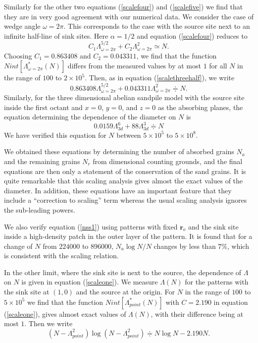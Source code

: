 \documentclass[11pt,a4paper]{book}
\begin{document}
Similarly for the other two equations (\ref{scalefour}) and (\ref{scalefive})
we find that they are in very good agreement with our numerical data.
We consider the case of wedge angle $\omega=2\pi$. 
This corresponds to the case with the source site next to an infinite half-line of sink sites.
Here $\alpha=1/2$ and equation (\ref{scalefour}) reduces to
\begin{equation}
C_{1}\Lambda_{\omega=2\pi}^{5/2}+C_{2}\Lambda_{\omega=2\pi}^{2}\simeq N.
\end{equation}
Choosing $C_{1}=0.863408$ and $C_{2}=0.043311$, we find that the function
$Nint\left[ \Lambda^{\ast}_{\omega=2\pi}\left( N \right) \right]$
differs from the measured values by at most $1$ for all $N$ in the range of $100$ to $2\times10^{5}$.
Then, as in equation (\ref{scalethreehalf}), we write
\begin{equation}
0.863408\Lambda_{\omega=2\pi}^{5/2}+0.043311\Lambda_{\omega=2\pi}^{2}\doteqdot N.
\label{scalefourhalf}
\end{equation}
Similarly, for the three dimensional abelian sandpile model with the source site inside the first octant
and $x=0$, $y=0$, and $z=0$ as the absorbing planes, the equation determining
the dependence of the diameter on $N$ is
\begin{equation}
0.0159\Lambda_{3d}^{6}+88\Lambda_{3d}^{3}\doteqdot N
\label{scalefivehalf}
\end{equation}
We have verified this equation for $N$ between $5\times10^{5}$ to $5\times10^{8}$.

We obtained these equations by determining the number of absorbed grains $N_{a}$ and the
remaining grains $N_{r}$ from dimensional counting grounds, and
the final equations are then only a statement
of the conservation of the sand grains. It is quite remarkable that this scaling
analysis gives almost the exact values of the diameter.
In addition, these equations have an important feature that they include a ``correction to
scaling'' term whereas the usual scaling analysis ignores the sub-leading powers.

We also verify equation (\ref{nss1}) using patterns with fixed $\mathbf{r}_{o}$
and the sink site inside a high-density patch in the outer layer of the pattern.
It is found that for a change of $N$ from $224000$ to $896000$, $N_{a}\log{N}/N$
changes by less than $7\%$, which is consistent with the scaling relation. 

In the other limit, where the sink site is next to the source, the dependence of $\Lambda$
on $N$ is given in equation (\ref{scaleone}). We measure $\Lambda\left( N \right)$ for the patterns with
the sink site at $\left( 1, 0 \right)$ and the source at the origin. For $N$ in the
range of $100$ to $5\times 10^{5}$ we find
that the function $Nint[\Lambda^{\ast}_{point}\left( N \right)]$ with $C=2.190$ in equation (\ref{scaleone}),
gives almost exact values of $\Lambda\left( N \right)$, with their difference being at most $1$. Then we write
\begin{equation}
(N -\Lambda_{point}^{2})\log ( N -\Lambda_{point}^2) \doteqdot  N \log N - 2.190 N.
\end{equation} 
\end{document}
